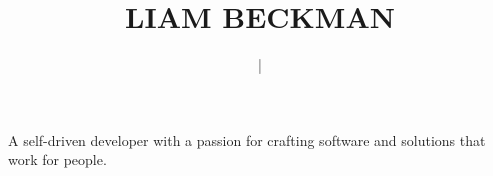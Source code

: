 \title{\textcolor{my-red}{LIAM BECKMAN}}
\author{
     \textcolor{my-grey}{|} 
}

\date{\vspace{-2em}}



\maketitle

\begin{center}
A self-driven developer with a passion for crafting software and solutions that work for people.\\
\end{center}

